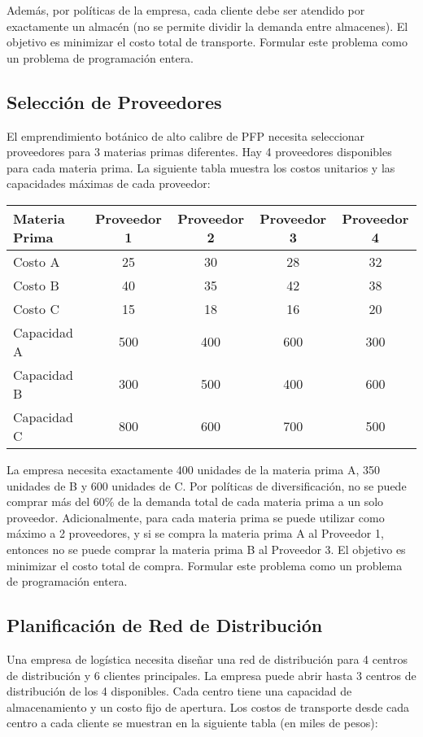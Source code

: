\documentclass[12pt]{article}
\begin{document}
Además, por políticas de la empresa, cada cliente debe ser atendido por exactamente un almacén (no se permite dividir la demanda entre almacenes). El objetivo es minimizar el costo total de transporte. Formular este problema como un problema de programación entera.

\subsection{Selección de Proveedores}
El emprendimiento botánico de alto calibre de PFP necesita seleccionar proveedores para 3 materias primas diferentes. Hay 4 proveedores disponibles para cada materia prima. La siguiente tabla muestra los costos unitarios y las capacidades máximas de cada proveedor:

\begin{table}[h]
\centering
\begin{tabular}{lcccc}
\toprule
\textbf{Materia Prima} & \textbf{Proveedor 1} & \textbf{Proveedor 2} & \textbf{Proveedor 3} & \textbf{Proveedor 4} \\
\midrule
Costo A & 25 & 30 & 28 & 32 \\
Costo B & 40 & 35 & 42 & 38 \\
Costo C & 15 & 18 & 16 & 20 \\
\midrule
Capacidad A & 500 & 400 & 600 & 300 \\
Capacidad B & 300 & 500 & 400 & 600 \\
Capacidad C & 800 & 600 & 700 & 500 \\
\bottomrule
\end{tabular}
\end{table}

La empresa necesita exactamente 400 unidades de la materia prima A, 350 unidades de B y 600 unidades de C. Por políticas de diversificación, no se puede comprar más del 60\% de la demanda total de cada materia prima a un solo proveedor. 
Adicionalmente, para cada materia prima se puede utilizar como máximo a 2 proveedores, y si se compra la materia prima A al Proveedor 1, entonces no se puede comprar la materia prima B al Proveedor 3. El objetivo es minimizar el costo total de compra. Formular este problema como un problema de programación entera.

\subsection{Planificación de Red de Distribución}
Una empresa de logística necesita diseñar una red de distribución para 4 centros de distribución y 6 clientes principales. La empresa puede abrir hasta 3 centros de distribución de los 4 disponibles. Cada centro tiene una capacidad de almacenamiento y un costo fijo de apertura. Los costos de transporte desde cada centro a cada cliente se muestran en la siguiente tabla (en miles de pesos):
\end{document}
